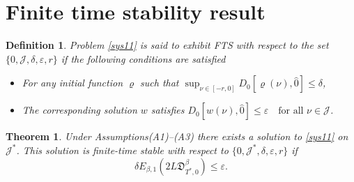 \documentclass[10pt,a4paper]{amsart}
\numberwithin{equation}{section}
\newtheorem{theorem}[theo]{Theorem}
\newtheorem{definition}[theo]{Definition}
\begin{document}
\section{Finite time stability result}

\begin{definition} \rm
Problem \eqref{sys11} is said to exhibit FTS with respect to the set 
$\{0,\mathcal{J},\delta,\varepsilon, r\}$ if the following conditions are 
satisfied
\begin{itemize}
 \item[(1)] For any initial function $\varrho$ such that
 $\sup_{\nu \in [- r,0]} D_0[\varrho(\nu ), \hat{0}] \leq \delta$,

\item[(2)] The corresponding solution $ w$ satisfies
 $D_0[ w(\nu ), \hat{0}] \leq \varepsilon \quad \text{for all } \nu \in \mathcal{J}$.
\end{itemize}
\end{definition}


\setcounter{theo}{1}
\begin{theorem}\label{theo33}
Under Assumptions{\rm (A1)--(A3)} there exists a solution to \eqref{sys11} 
on \( \mathcal{J}^{*} \). This solution is finite-time stable with respect to 
\( \{0, \mathcal{J}^{*}, \delta, \varepsilon, r\} \) if 
\begin{equation}\label{ineq315}
\delta E_{\beta, 1}(2 L\mathfrak{D}_{T^{*},0}^{\beta}) \leq \varepsilon .
\end{equation}
\end{theorem}
\end{document}
